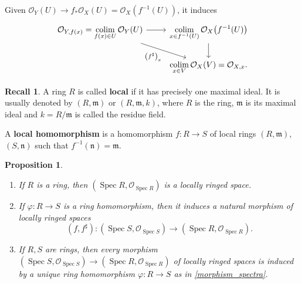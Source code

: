 \documentclass[12pt]{article}
\DeclareMathOperator{\Spec}{Spec}
\DeclareMathOperator*{\colim}{colim}
\newtheorem*{proposition}{Proposition}
\theoremstyle{definition}
\newtheorem*{recall}{Recall}
\begin{document}
Given $\mathcal{O}_Y(U)\rightarrow f_*\mathcal{O}_X(U)=\mathcal{O}_X(f^{-1}(U))$, it induces
\[
\begin{tikzcd}
\mathcal{O}_{Y,f(x)}=\displaystyle{\colim_{f(x)\in U}\mathcal{O}_Y(U)}\arrow[r]\arrow[rd,"\left(f^{\sharp}\right)_x",swap]&\displaystyle{\colim_{x\in f^{-1}(U)}\mathcal{O}_X\big(f^{-1}(U)\big)}\arrow[d]\\
&\displaystyle{\colim_{x\in V}\mathcal{O}_X(V)=\mathcal{O}_{X,x}.}
\end{tikzcd}
\]

\begin{recall}
A ring $R$ is called \textbf{local} if it has precisely one maximal ideal. It is usually denoted by $(R,\mathfrak{m})$ or $(R,\mathfrak{m},k)$, where $R$ is the ring, $\mathfrak{m}$ is its maximal ideal and $k=R/\mathfrak{m}$ is called the residue field.

A \textbf{local homomorphism} is a homomorphism $f:R\rightarrow S$ of local rings $(R,\mathfrak{m})$, $(S,\mathfrak{n})$ such that $f^{-1}(\mathfrak{n})=\mathfrak{m}$.
\end{recall}

\begin{proposition}
\begin{enumerate}[label=\arabic*)]
\item If $R$ is a ring, then $(\Spec R,\mathcal{O}_{\Spec R})$ is a locally ringed space.

\item\label{morphism_spectra} If $\varphi:R\rightarrow S$ is a ring homomorphism, then it induces a natural morphism of locally ringed spaces
\[(f,f^{\sharp}):(\Spec S,\mathcal{O}_{\Spec S})\longrightarrow(\Spec R,\mathcal{O}_{\Spec R}).\]

\item If $R,S$ are rings, then every morphism $(\Spec S,\mathcal{O}_{\Spec S})\rightarrow(\Spec R,\mathcal{O}_{\Spec R})$ of locally ringed spaces is induced by a unique ring homomorphism $\varphi:R\rightarrow S$ as in \ref{morphism_spectra}.
\end{enumerate}
\end{proposition}
\end{document}
